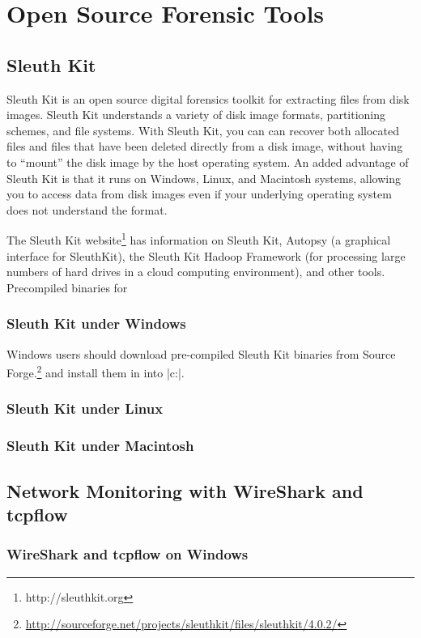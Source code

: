 \chapter{Open Source Forensic Tools}

\section{Sleuth Kit}

Sleuth Kit is an open source digital forensics toolkit for extracting
files from disk images. Sleuth Kit understands a variety of disk image
formats, partitioning schemes, and file systems. With Sleuth Kit, you can can recover
both allocated files and files that have been deleted directly from a
disk image, without having to ``mount'' the disk image by the host
operating system. An added advantage of Sleuth Kit is that it runs on
Windows, Linux, and Macintosh systems, allowing you to access data
from disk images even if your underlying operating system does not
understand the format.

The Sleuth Kit website\footnote{http://sleuthkit.org} has information
on Sleuth Kit, Autopsy (a graphical interface for SleuthKit), the
Sleuth Kit Hadoop Framework (for processing large numbers of hard
drives in a cloud computing environment), and other tools. 
Precompiled binaries for

\subsection{Sleuth Kit under Windows}
Windows users should download pre-compiled Sleuth Kit binaries from Source
Forge.\footnote{\url{http://sourceforge.net/projects/sleuthkit/files/sleuthkit/4.0.2/}}
and install them in into |c:\sleuthkit|.

\subsection{Sleuth Kit under Linux}

\subsection{Sleuth Kit under Macintosh}

\section{Network Monitoring with WireShark and tcpflow}

\subsection{WireShark and tcpflow on Windows}

